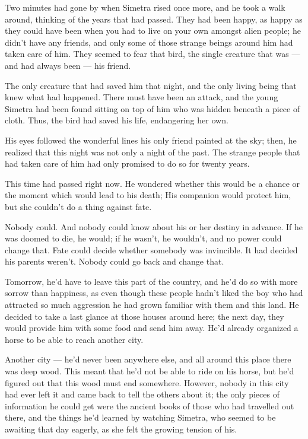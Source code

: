 Two minutes had gone by when Simetra rised once more, and he took a walk around, thinking of the years that had passed. They had been happy, as happy as they could have been when you had to live on your own amongst alien people; he didn't have any friends, and only some of those strange beings around him had taken care of him. They seemed to fear that bird, the single creature that was --- and had always been --- his friend.

The only creature that had saved him that night, and the only living being that knew what had happened. There must have been an attack, and the young Simetra had been found sitting on top of him who was hidden beneath a piece of cloth. Thus, the bird had saved his life, endangering her own.

His eyes followed the wonderful lines his only friend painted at the sky; then, he realized that this night was not only a night of the past. The strange people that had taken care of him had only promised to do so for twenty years.

This time had passed right now. He wondered whether this would be a chance or the moment which would lead to his death; His companion would protect him, but she couldn't do a thing against fate.

Nobody could. And nobody could know about his or her destiny in advance. If he was doomed to die, he would; if he wasn't, he wouldn't, and no power could change that.
Fate could decide whether somebody was invincible. It had decided his parents weren't.
Nobody could go back and change that.

Tomorrow, he'd have to leave this part of the country, and he'd do so with more sorrow than happiness, as even though these people hadn't liked the boy who had attracted so much aggression he had grown familiar with them and this land.
He decided to take a last glance at those houses around here; the next day, they would provide him with some food and send him away. He'd already organized a horse to be able to reach another city.

Another city --- he'd never been anywhere else, and all around this place there was deep wood. This meant that he'd not be able to ride on his horse, but he'd figured out that this wood must end somewhere. However, nobody in this city had ever left it and came back to tell the others about it; the only pieces of information he could get were the ancient books of those who had travelled out there, and the things he'd learned by watching Simetra, who seemed to be awaiting that day eagerly, as she felt the growing tension of his.

